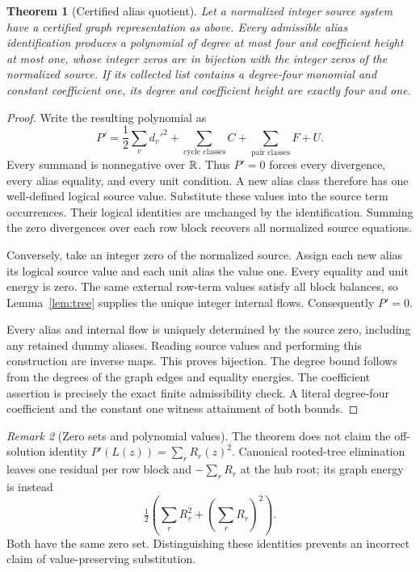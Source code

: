 \documentclass[11pt,letterpaper]{article}
\newtheorem{theorem}{Theorem}[section]
\theoremstyle{definition}\newtheorem{definition}[theorem]{Definition}
\theoremstyle{remark}\newtheorem{remark}[theorem]{Remark}
\begin{document}
\begin{theorem}[Certified alias quotient]\label{thm:quotient}
Let a normalized integer source system have a certified graph representation
as above. Every admissible alias identification produces a polynomial of
degree at most four and coefficient height at most one, whose integer zeros
are in bijection with the integer zeros of the normalized source. If its
collected list contains a degree-four monomial and constant coefficient one,
its degree and coefficient height are exactly four and one.
\end{theorem}
\begin{proof}
Write the resulting polynomial as
\[
 P'=\frac12\sum_v d_v'^2+\sum_{\text{cycle classes}}C+
          \sum_{\text{pair classes}}F+U.
\]
Every summand is nonnegative over $\mathbb R$. Thus $P'=0$ forces every divergence,
every alias equality, and every unit condition. A new alias class therefore
has one well-defined logical source value. Substitute these values into
the source term occurrences. Their logical identities are unchanged by
the identification. Summing the zero divergences over each row block
recovers all normalized source equations.

Conversely, take an integer zero of the normalized source. Assign each
new alias its logical source value and each unit alias the value one.
Every equality and unit energy is zero. The same external row-term values
satisfy all block balances, so Lemma~\ref{lem:tree} supplies the unique
integer internal flows. Consequently $P'=0$.

Every alias and internal flow is uniquely determined by the source zero,
including any retained dummy aliases. Reading source values and performing
this construction are inverse maps. This proves bijection. The degree
bound follows from the degrees of the graph edges and equality energies.
The coefficient assertion is precisely the exact finite admissibility
check. A literal degree-four coefficient and the constant one witness
attainment of both bounds.
\end{proof}

\begin{remark}[Zero sets and polynomial values]
The theorem does not claim the off-solution identity
$P'(L(z))=\sum_r R_r(z)^2$. Canonical rooted-tree elimination leaves one
residual per row block and $-\sum_rR_r$ at the hub root; its graph energy
is instead
\[
 \tfrac12\left(\sum_rR_r^2+(\sum_rR_r)^2\right).
\]
Both have the same zero set. Distinguishing these identities prevents an
incorrect claim of value-preserving substitution.
\end{remark}
\end{document}
